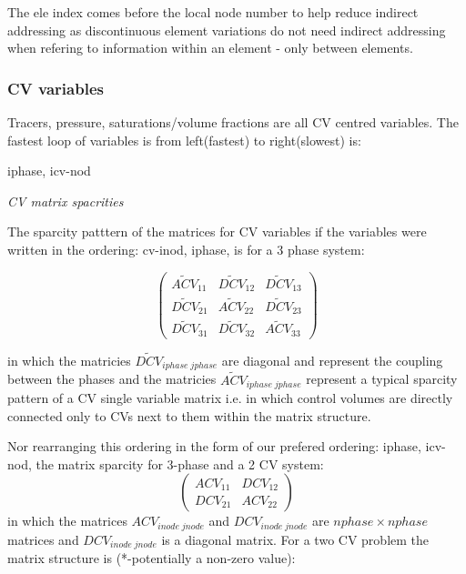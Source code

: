 The ele index comes before the local node number to help reduce indirect addressing
as discontinuous element variations do not need indirect addressing when refering
to information within an element - only between elements.

\subsubsection{CV variables}
Tracers, pressure, saturations/volume fractions are all CV centred variables.
The fastest loop of variables is from left(fastest) to right(slowest) is:

\par\noindent
iphase, icv-nod

\par\noindent
{\it CV matrix spacrities}

The sparcity patttern of the matrices for CV variables if the variables were written
in the ordering: cv-inod, iphase, is for a 3 phase system:

\begin{equation}
  \begin{pmatrix}
\widetilde {ACV}_{11}  &  \widetilde {DCV}_{12}  &  \widetilde {DCV}_{13} \\
\widetilde {DCV}_{21}  &  \widetilde {ACV}_{22}  &  \widetilde {DCV}_{23} \\
\widetilde {DCV}_{31}  &  \widetilde {DCV}_{32}  &  \widetilde {ACV}_{33}
  \end{pmatrix}
\label{CV-mat-spar}
\end{equation}

in which the matricies $\widetilde {DCV}_{iphase\; jphase}$ are diagonal and represent the
coupling between the phases and the matricies $\widetilde {ACV}_{iphase\; jphase}$ represent
a typical sparcity pattern of a CV single variable matrix i.e. in which control volumes are
directly connected only to CVs next to them within the matrix structure.

Nor rearranging this ordering in the form of our prefered ordering:  iphase, icv-nod,
the matrix sparcity for 3-phase and a 2 CV system:
\begin{equation}
  \begin{pmatrix}
ACV_{11}  &  DCV_{12}   \\
DCV_{21}  &  ACV_{22}
  \end{pmatrix}
\label{CV-mat-spar}
\end{equation}
in which the matrices $ACV_{inode\; jnode}$ and $DCV_{inode\; jnode}$ are $nphase \times nphase$ matrices and $DCV_{inode\; jnode}$
is a diagonal matrix.
For
a two CV problem the matrix structure is (*-potentially a non-zero value):

